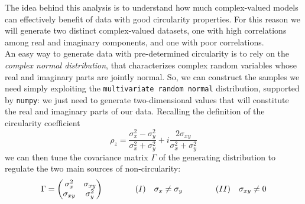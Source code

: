 \documentclass[../main.tex]{subfiles}
\begin{document}
The idea behind this analysis is to understand how much complex-valued models can effectively benefit of data with good circularity properties. For this reason we will generate two distinct complex-valued datasets, one with high correlations among real and imaginary components, and one with poor correlations.\\
An easy way to generate data with pre-determined circularity is to rely on the \textit{complex normal distribution}, that characterizes complex random variables whose real and imaginary parts are jointly normal. So, we can construct the samples we need simply exploiting the \texttt{multivariate random normal} distribution, supported by \texttt{numpy}: we just need to generate two-dimensional values that will constitute the real and imaginary parts of our data. Recalling the definition of the circularity coefficient
\[ \rho_z = \frac{\sigma_x^2 - \sigma_y^2}{\sigma_x^2 + \sigma_y^2} + i\frac{2\sigma_{xy}}{\sigma_x^2 + \sigma_y^2} \]
we can then tune the covariance matrix $\Gamma$ of the generating distribution to regulate the two main sources of non-circularity:
\[ \Gamma=\mqty(\sigma_x^2 & \sigma_{xy} \\ \sigma_{xy} & \sigma_y^2) \qquad\qquad  (I)\quad\sigma_x\neq\sigma_y \qquad\qquad (II)\quad\sigma_{xy}\neq 0 \]
\end{document}
